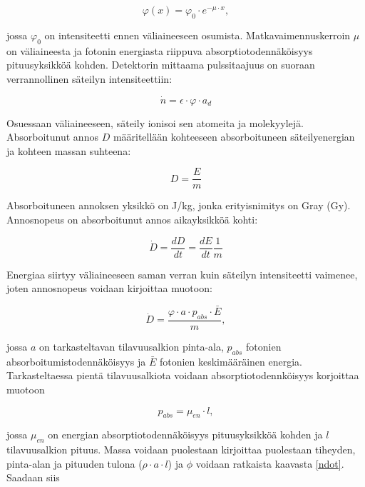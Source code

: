 \documentclass[a4paper,11pt]{article}
\begin{document}
\begin{equation}
  \varphi(x) = \varphi_0 \cdot e^{-\mu \cdot x} ,
\end{equation}

jossa $\varphi_0$ on intensiteetti ennen väliaineeseen osumista. Matkavaimennuskerroin $\mu$ on väliaineesta ja fotonin energiasta riippuva absorptiotodennäköisyys pituusyksikköä kohden. Detektorin mittaama pulssitaajuus on suoraan verrannollinen säteilyn intensiteettiin: 

\begin{equation}
  \label{ndot}
  \dot{n} = \epsilon \cdot \varphi \cdot a_d 
\end{equation}

Osuessaan väliaineeseen, säteily ionisoi sen atomeita ja molekyylejä. Absorboitunut annos $D$ määritellään kohteeseen absorboituneen säteilyenergian ja kohteen massan suhteena: 

\begin{equation}
  D = \frac{E}{m}
\end{equation}

Absorboituneen annoksen yksikkö on J/kg, jonka erityisnimitys on Gray (Gy). Annosnopeus on absorboitunut annos aikayksikköä kohti: 

\begin{equation}
  \dot{D} = \frac{dD}{dt} = \frac {dE}{dt} \frac{1}{m}
\end{equation}

Energiaa siirtyy väliaineeseen saman verran kuin säteilyn intensiteetti vaimenee, joten annosnopeus voidaan kirjoittaa muotoon: 

\begin{equation}
  \label{annos3}
  \dot{D} = \frac{\varphi \cdot a \cdot p_{abs} \cdot \bar{E}}{m} ,
\end{equation}

jossa $a$ on tarkasteltavan tilavuusalkion pinta-ala, $p_{abs}$ fotonien absorboitumistodennäköisyys ja $\bar{E}$ fotonien keskimääräinen energia. Tarkasteltaessa pientä tilavuusalkiota voidaan absorptiotodennköisyys korjoittaa muotoon

\begin{equation}
  p_{abs} = \mu_{en} \cdot l ,
\end{equation}

jossa $\mu_{en}$ on energian absorptiotodennäköisyys pituusyksikköä kohden ja $l$ tilavuusalkion pituus. Massa voidaan puolestaan kirjoittaa puolestaan tiheyden, pinta-alan ja pituuden tulona ($\rho \cdot a \cdot l$) ja $\phi$ voidaan ratkaista kaavasta \ref{ndot}. Saadaan siis 
\end{document}
